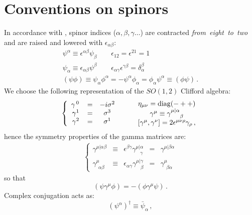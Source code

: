 \documentclass[a4paper,12pt]{article}
\begin{document}
\section{Conventions on spinors}
In accordance with \cite{susp}, spinor indices ($\alpha,\beta,\gamma\ldots$)
are contracted \emph{from\ eight\ to\ two} and are raised and lowered with
$\epsilon_{\alpha\beta}$:
\begin{eqnarray}
\psi^\alpha\equiv\epsilon^{\alpha\beta}\psi_\beta\qquad
\epsilon_{12}=\epsilon^{21}=1\nonumber\\
\psi_\alpha\equiv\epsilon_{\alpha\beta}\psi^\beta\qquad
\epsilon_{\alpha\gamma}\epsilon^{\gamma\beta}=\delta_\alpha^\beta\nonumber\\
(\psi\phi)\equiv\psi_\alpha\phi^\alpha=-\psi^\alpha\phi_\alpha=
\phi_\alpha\psi^\alpha\equiv(\phi\psi)\,.
\end{eqnarray}
We choose the following representation of the $SO(1,2)$ Clifford algebra:
\begin{eqnarray}
\left\{\begin{array}{ccc}
\gamma^{\,0\,}&=&-i\sigma^2\\
\gamma^1&=&\sigma^3\\
\gamma^2&=&\sigma^1
\end{array}\right.\qquad
\begin{array}{c}
\eta_{\mu\nu}={\rm diag}(-++)\\
\gamma^\mu\equiv\gamma^{\mu|\alpha}_{\ \ \ \ \beta}\\
\left[\gamma^\mu,\gamma^\nu\right]=2\epsilon^{\mu\nu\rho}\gamma_\rho\,,
\end{array}
\end{eqnarray}
hence the symmetry properties of the gamma matrices are:
\begin{eqnarray}
\left\{\begin{array}{ccccc}
\gamma^{\mu|\alpha\beta}&\equiv&\epsilon^{\beta\gamma}
\gamma^{\mu|\alpha}_{\ \ \ \ \gamma}&=&\gamma^{\mu|\beta\alpha}\\
\gamma^\mu_{\ \ \alpha\beta}&\equiv&\epsilon_{\alpha\gamma}
\gamma^{\mu|\gamma}_{\ \ \ \ \beta}&=&\gamma^\mu_{\ \ \beta\alpha}
\end{array}\right.
\end{eqnarray}
so that
\begin{equation}
(\psi\gamma^\mu\phi)=-(\phi\gamma^\mu\psi)\,.
\end{equation}
Complex conjugation acts as:
\begin{equation}
(\psi^\alpha)^\dagger\equiv\bar\psi_\alpha\,,
\end{equation}
\end{document}
